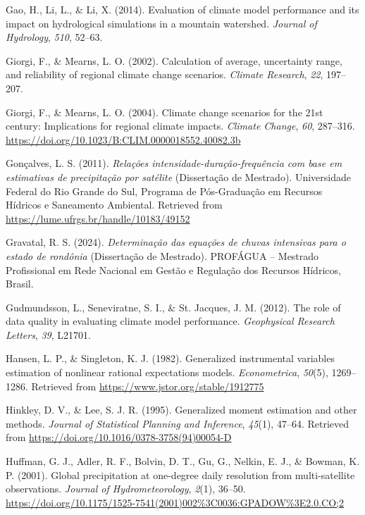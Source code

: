 \documentclass[
]{agujournal2019}
\newlength{\cslhangindent}
\newenvironment{CSLReferences}[2] %
 {\begin{list}{}{%
  \setlength{\itemindent}{0pt}
  \setlength{\leftmargin}{0pt}
  \setlength{\parsep}{0pt}
  \ifodd #1
   \setlength{\leftmargin}{\cslhangindent}
   \setlength{\itemindent}{-1\cslhangindent}
  \fi
  \setlength{\itemsep}{#2\baselineskip}}}
 {\end{list}}
\begin{document}
\begin{CSLReferences}{1}{0}
Gao, H., Li, L., \& Li, X. (2014). Evaluation of climate model
performance and its impact on hydrological simulations in a mountain
watershed. \emph{Journal of Hydrology}, \emph{510}, 52--63.

Giorgi, F., \& Mearns, L. O. (2002). Calculation of average, uncertainty
range, and reliability of regional climate change scenarios.
\emph{Climate Research}, \emph{22}, 197--207.

Giorgi, F., \& Mearns, L. O. (2004). Climate change scenarios for the
21st century: Implications for regional climate impacts. \emph{Climate
Change}, \emph{60}, 287--316.
\url{https://doi.org/10.1023/B:CLIM.0000018552.40082.3b}

Gonçalves, L. S. (2011). \emph{Relações intensidade-duração-frequência
com base em estimativas de precipitação por satélite} (Dissertação de
Mestrado). Universidade Federal do Rio Grande do Sul, Programa de
Pós-Graduação em Recursos Hídricos e Saneamento Ambiental. Retrieved
from \url{https://lume.ufrgs.br/handle/10183/49152}

Gravatal, R. S. (2024). \emph{Determinação das equações de chuvas
intensivas para o estado de rondônia} (Dissertação de Mestrado).
PROFÁGUA -- Mestrado Profissional em Rede Nacional em Gestão e Regulação
dos Recursos Hídricos, Brasil.

Gudmundsson, L., Seneviratne, S. I., \& St. Jacques, J. M. (2012). The
role of data quality in evaluating climate model performance.
\emph{Geophysical Research Letters}, \emph{39}, L21701.

Hansen, L. P., \& Singleton, K. J. (1982). Generalized instrumental
variables estimation of nonlinear rational expectations models.
\emph{Econometrica}, \emph{50}(5), 1269--1286. Retrieved from
\url{https://www.jstor.org/stable/1912775}

Hinkley, D. V., \& Lee, S. J. R. (1995). Generalized moment estimation
and other methods. \emph{Journal of Statistical Planning and Inference},
\emph{45}(1), 47--64. Retrieved from
\url{https://doi.org/10.1016/0378-3758(94)00054-D}

Huffman, G. J., Adler, R. F., Bolvin, D. T., Gu, G., Nelkin, E. J., \&
Bowman, K. P. (2001). Global precipitation at one-degree daily
resolution from multi-satellite observations. \emph{Journal of
Hydrometeorology}, \emph{2}(1), 36--50.
\url{https://doi.org/10.1175/1525-7541(2001)002\%3C0036:GPADOW\%3E2.0.CO;2}


\end{CSLReferences}
\end{document}
